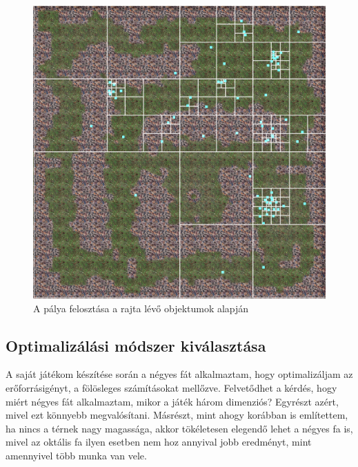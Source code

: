\begin{figure}[h]
\centering
\includegraphics[scale=0.2]{kepek/quadtree.png}
\caption{A pálya felosztása a rajta lévő objektumok alapján}
\label{fig:quadtree}
\end{figure}

\subsection{Optimalizálási módszer kiválasztása}

A saját játékom készítése során a négyes fát alkalmaztam, hogy optimalizáljam az erőforrásigényt, a fölösleges számításokat mellőzve. Felvetődhet a kérdés, hogy miért négyes fát alkalmaztam, mikor a játék három dimenziós? Egyrészt azért, mivel ezt könnyebb megvalósítani. Másrészt, mint ahogy korábban is említettem, ha nincs a térnek nagy magassága, akkor tökéletesen elegendő lehet a négyes fa is, mivel az oktális fa ilyen esetben nem hoz annyival jobb eredményt, mint amennyivel több munka van vele.
